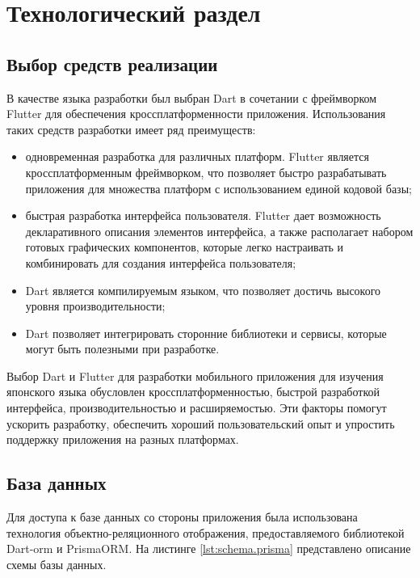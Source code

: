 \chapter{Технологический раздел}

\section{Выбор средств реализации}

В качестве языка разработки был выбран Dart в сочетании с фреймворком Flutter для обеспечения кроссплатформенности приложения. Использования таких средств разработки имеет ряд преимуществ:

\begin{itemize}[label=---]
    \item одновременная разработка для различных платформ. Flutter является кроссплатформенным фреймворком, что позволяет быстро разрабатывать приложения для множества платформ с использованием единой кодовой базы;
    \item быстрая разработка интерфейса пользователя. Flutter дает возможность декларативного описания элементов интерфейса, а также располагает набором готовых графических компонентов, которые легко настраивать и комбинировать для создания интерфейса пользователя;
    \item Dart является компилируемым языком, что позволяет достичь высокого уровня производительности;
    \item Dart позволяет интегрировать сторонние библиотеки и сервисы, которые могут быть полезными при разработке.
\end{itemize}

Выбор Dart и Flutter для разработки мобильного приложения для изучения японского языка обусловлен кроссплатформенностью, быстрой разработкой интерфейса, производительностью и расширяемостью. Эти факторы помогут ускорить разработку, обеспечить хороший пользовательский опыт и упростить поддержку приложения на разных платформах.

\clearpage

\section{База данных}

Для доступа к базе данных со стороны приложения была использована технология объектно-реляционного отображения, предоставляемого библиотекой Dart-orm и PrismaORM. На листинге \ref{lst:schema.prisma} представлено описание схемы базы данных.

